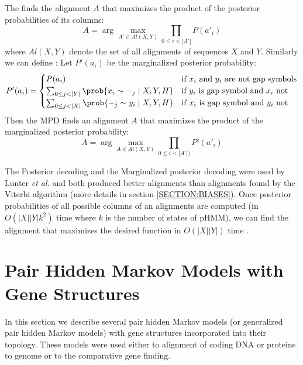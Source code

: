 The  finds the alignment $A$ that maximizes
the product of the posterior probabilities of its columns: 
\[A = \arg\max_{A'\in Al(X,Y)}\prod_{0\leq i <
|A'|}P(a'_i)\] where $Al(X,Y)$ denote the set of all  alignments of sequences
$X$ and $Y$. Similarly we can define : Let $P'(a_i)$ be the marginalized posterior probability:
\[
P'(a_i) = \begin{cases}
P(a_i) & \text{if $x_i$ and $y_i$ are not gap symbols}\\
\sum_{0\leq j < |Y|}\prob{x_i\sim -_{j}\mid X,Y,H}  & \text{if $y_i$ is gap symbol and $x_i$ not}\\
\sum_{0\leq j < |X|} \prob{-_{j}\sim y_i\mid X,Y,H}  & \text{if $x_i$ is gap symbol and $y_i$ not}
\end{cases}
\]
Then the MPD finds an alignment $A$ that maximizes the product of the
marginalized posterior probability:
\[A = \arg\max_{A\in Al(X,Y)}\prod_{0\leq i < |A'|)}P'(a'_i)\] 

The Posterior decoding and the Marginalized posterior decoding were used by
Lunter {\it et al.} and both produced better alignments than alignments found
by the Viterbi algorithm (more details in section \ref{SECTION:BIASES}). Once posterior probabilities of all possible columns of an
alignments are computed (in $O(|X||Y|k^2)$ time where $k$ is the number of
states of pHMM), we can find the alignment that maximizes the desired
function in $O(|X||Y|)$ time \cite{Lunter2008}. 



\section{Pair Hidden Markov Models with Gene Structures}

In this section we describe several pair hidden Markov models (or generalized
pair hidden Markov models) with gene structures incorporated into their
topology. These models were used either to alignment of coding DNA or proteins
to genome or to the comparative gene finding.

